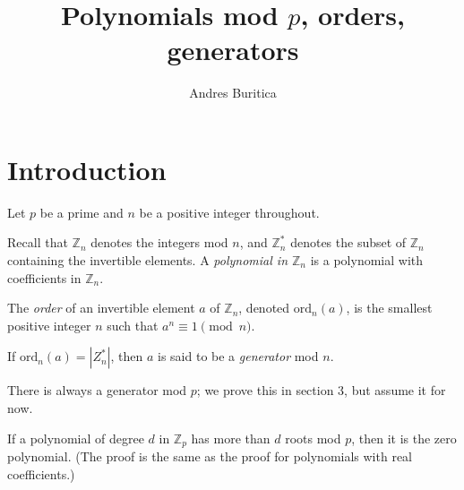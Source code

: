 \documentclass{article}
\title{Polynomials mod $p$, orders, generators}
\author{Andres Buritica}
\date{}
\newcommand\Zz{\mathbb{Z}}
\newcommand\ord{\mathrm{ord}}
\begin{document}
\maketitle
\section{Introduction}
  Let $p$ be a prime and $n$ be a positive integer throughout.

  Recall that $\Zz_n$ denotes the integers mod $n$, and $\Zz_n^*$ denotes the
  subset of $\Zz_n$ containing the invertible elements. A \emph{polynomial in
  $\Zz_n$} is a polynomial with coefficients in $\Zz_n$.

  The \emph{order} of an invertible element $a$ of $\Zz_n$, denoted $\ord_n(a)$,
  is the smallest positive integer $n$ such that $a^n\equiv 1\pmod n$.

  If $\ord_n(a)=|Z_n^*|$, then $a$ is said to be a \emph{generator} mod $n$.

  There is always a generator mod $p$; we prove this in section 3, but assume it for
  now.

  If a polynomial of degree $d$ in $\Zz_p$ has more than $d$ roots mod
  $p$, then it is the zero polynomial. (The proof is the same as the
  proof for polynomials with real coefficients.)
\end{document}
